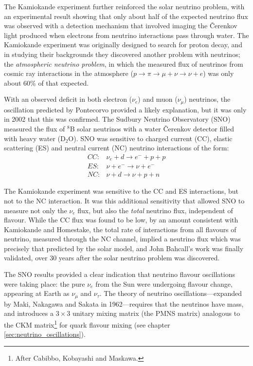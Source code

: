The Kamiokande experiment further reinforced the solar neutrino problem, with an experimental result showing that only about half of the expected neutrino flux was observed with a detection mechanism that involved imaging the Čerenkov light produced when electrons from neutrino interactions pass through water\citep{Hirata1989}. The Kamiokande experiment was originally designed to search for proton decay, and in studying their backgrounds they discovered another problem with neutrinos; the \emph{atmospheric neutrino problem}, in which the measured flux of neutrinos from cosmic ray interactions in the atmosphere ($p\rightarrow \pi \rightarrow \mu + \nu \rightarrow \nu + e$) was only about 60\% of that expected.

With an observed deficit in both electron ($\nu_e$) and muon ($\nu_\mu$) neutrinos, the oscillation predicted by Pontecorvo provided a likely explanation, but it was only in 2002 that this was confirmed. The Sudbury Neutrino Observatory (SNO) measured the flux of $^8\mathrm{B}$ solar neutrinos\citep{Ahmad2001} with a water Čerenkov detector filled with heavy water ($\mathrm{D}_2\mathrm{O}$). SNO was sensitive to charged current (CC), elastic scattering (ES) and neutral current (NC) neutrino interactions of the form:
\begin{eqnarray*}
CC: & \nu_e + d \rightarrow e^{-} + p + p \\
ES: & \nu + e^{-} \rightarrow \nu + e^{-} \\
NC: & \nu + d \rightarrow \nu + p + n 
\end{eqnarray*}

The Kamiokande experiment was sensitive to the CC and ES interactions, but not to the NC interaction. It was this additional sensitivity that allowed SNO to measure not only the $\nu_e$ flux, but also the \emph{total} neutrino flux, independent of flavour. While the CC flux was found to be low, by an amount consistent with Kamiokande and Homestake, the total rate of interactions from all flavours of neutrino, measured through the NC channel, implied a neutrino flux which was precisely that predicted by the solar model, and John Bahcall's work was finally validated, over 30 years after the solar neutrino problem was discovered.

The SNO results provided a clear indication that neutrino flavour oscillations were taking place: the pure $\nu_e$ from the Sun were undergoing flavour change, appearing at Earth as $\nu_\mu$ and $\nu_\tau$. The theory of neutrino oscillations---expanded by Maki, Nakagawa and Sakata in 1962\citep{Maki1962}---requires that the neutrinos have mass, and introduces a $3\times 3$ unitary mixing matrix (the PMNS matrix) analogous to the CKM matrix\footnote{After Cabibbo, Kobayashi and Maskawa.} for quark flavour mixing (see chapter \ref{sec:neutrino_oscillations}).

